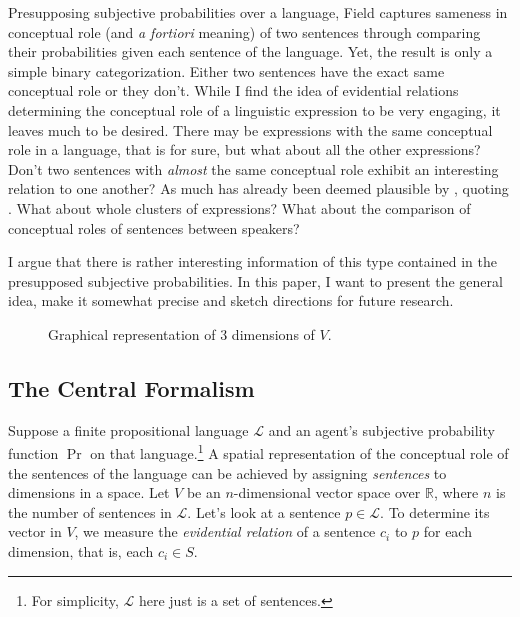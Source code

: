 \documentclass[11pt, a4paper]{scrartcl}
\renewcommand{\i}[1]{\emph{#1}}
\renewcommand{\L}{\mathcal{L}}
\newcommand{\m}[1]{\textswab{#1}}
\begin{document}
Presupposing subjective probabilities over a language, Field captures sameness in conceptual role (and \i{a fortiori} meaning) of two sentences through comparing their probabilities given each sentence of the language. Yet, the result is only a simple binary categorization. Either two sentences have the exact same conceptual role or they don't. While I find the idea of evidential relations determining the conceptual role of a linguistic expression to be very engaging, it leaves much to be desired. There may be expressions with the same conceptual role in a language, that is for sure, but what about all the other expressions? Don't two sentences with \i{almost} the same conceptual role exhibit an interesting relation to one another? As much has already been deemed plausible by \textcite{Leitgeb2008-LEIAIR}, quoting \textcite{Goodman1949-GOOOLO}. What about whole clusters of expressions? What about the comparison of conceptual roles of sentences between speakers? 

I argue that there is rather interesting information of this type contained in the presupposed subjective probabilities. In this paper, I want to present the general idea, make it somewhat precise and sketch directions for future research.

\begin{figure}
    \centering
{}
\caption{Graphical representation of 3 dimensions of $V$.}
\end{figure}

\subsection{The Central Formalism}\label{sec:central}

Suppose a finite propositional language $\L$ and an agent's subjective probability function $\Pr$ on that language.\footnote{For simplicity, $\L$ here just is a set of sentences.} A spatial representation of the conceptual role of the sentences of the language can be achieved by assigning \i{sentences} to dimensions in a space. Let $V$ be an $n$-dimensional vector space over $\mathbb{R}$, where $n$ is the number of sentences in $\L$. Let's look at a sentence $p \in \L$. To determine its vector in $V$, we measure the \i{evidential relation} of a sentence $c_i$ to $p$ for each dimension, that is, each $c_i \in S$. 
\end{document}
